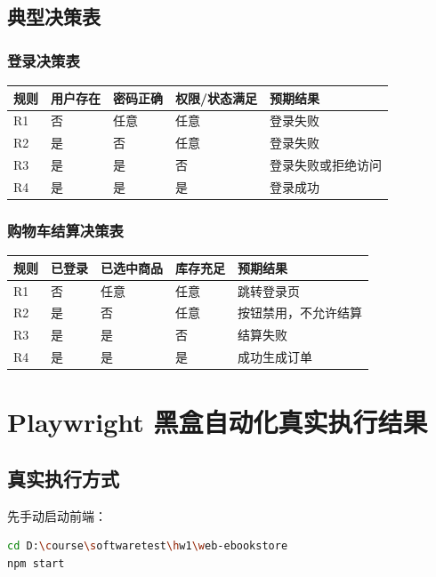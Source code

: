 \documentclass[UTF8,a4paper,12pt]{ctexart}
\begin{document}
\subsection{典型决策表}

\subsubsection{登录决策表}

\begin{longtable}{p{2cm}p{2.5cm}p{2.5cm}p{3cm}p{4cm}}
\toprule
规则 & 用户存在 & 密码正确 & 权限/状态满足 & 预期结果 \\
\midrule
R1 & 否 & 任意 & 任意 & 登录失败 \\
R2 & 是 & 否 & 任意 & 登录失败 \\
R3 & 是 & 是 & 否 & 登录失败或拒绝访问 \\
R4 & 是 & 是 & 是 & 登录成功 \\
\bottomrule
\end{longtable}

\subsubsection{购物车结算决策表}

\begin{longtable}{p{2cm}p{2.5cm}p{2.5cm}p{2.5cm}p{4cm}}
\toprule
规则 & 已登录 & 已选中商品 & 库存充足 & 预期结果 \\
\midrule
R1 & 否 & 任意 & 任意 & 跳转登录页 \\
R2 & 是 & 否 & 任意 & 按钮禁用，不允许结算 \\
R3 & 是 & 是 & 否 & 结算失败 \\
R4 & 是 & 是 & 是 & 成功生成订单 \\
\bottomrule
\end{longtable}

\section{Playwright 黑盒自动化真实执行结果}

\subsection{真实执行方式}

先手动启动前端：

\begin{lstlisting}[language=bash]
cd D:\course\softwaretest\hw1\web-ebookstore
npm start
\end{lstlisting}
\end{document}
